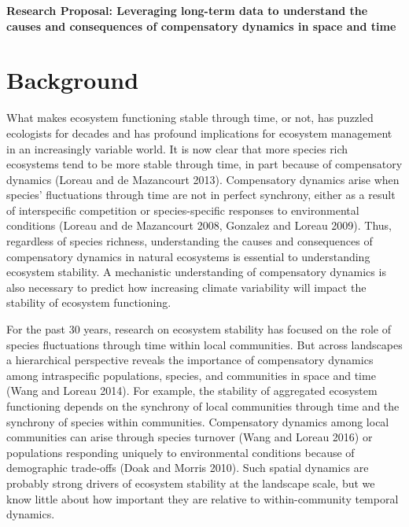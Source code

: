 \documentclass[12pt,]{article}
\begin{document}
\newpage{}


\begin{center}
\large{\bf{Research Proposal: Leveraging long-term data to understand the causes and consequences of compensatory dynamics in space and time}}
\end{center}

\setlength{\parindent}{0ex}

\section{Background}

What makes ecosystem functioning stable through time, or not, has
puzzled ecologists for decades and has profound implications for
ecosystem management in an increasingly variable world. It is now clear
that more species rich ecosystems tend to be more stable through time,
in part because of compensatory dynamics (Loreau and {{de Mazancourt}}
2013). Compensatory dynamics arise when species' fluctuations through
time are not in perfect synchrony, either as a result of interspecific
competition or species-specific responses to environmental conditions
(Loreau and {{de Mazancourt}} 2008, Gonzalez and Loreau 2009). Thus,
regardless of species richness, understanding the causes and
consequences of compensatory dynamics in natural ecosystems is essential
to understanding ecosystem stability. A mechanistic understanding of
compensatory dynamics is also necessary to predict how increasing
climate variability will impact the stability of ecosystem functioning.

For the past 30 years, research on ecosystem stability has focused on
the role of species fluctuations through time within local communities.
But across landscapes a hierarchical perspective reveals the importance
of compensatory dynamics among intraspecific populations, species, and
communities in space and time (Wang and Loreau 2014). For example, the
stability of aggregated ecosystem functioning depends on the synchrony
of local communities through time and the synchrony of species within
communities. Compensatory dynamics among local communities can arise
through species turnover (Wang and Loreau 2016) or populations
responding uniquely to environmental conditions because of demographic
trade-offs (Doak and Morris 2010). Such spatial dynamics are probably
strong drivers of ecosystem stability at the landscape scale, but we
know little about how important they are relative to within-community
temporal dynamics.
\end{document}
